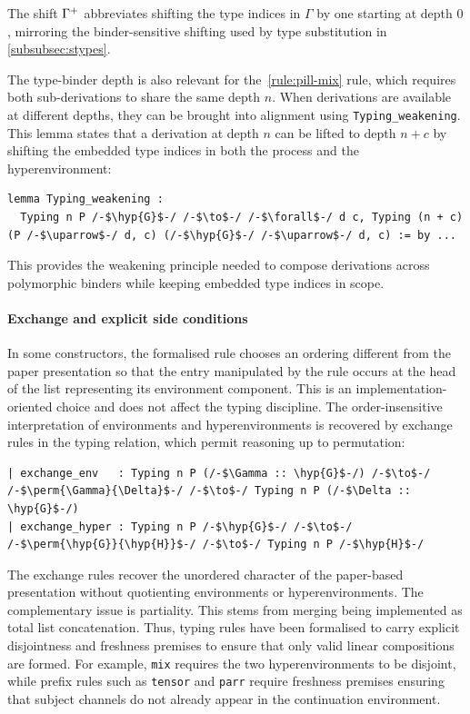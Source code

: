 The shift {$\Gamma^{+}$} abbreviates shifting the type indices in $\Gamma$ by one starting at depth $0$, mirroring the binder-sensitive shifting used by type substitution in \cref{subsubsec:stypes}.

The type-binder depth is also relevant for the~\ref{rule:pill-mix} rule, which requires both sub-derivations to share the same depth $n$. When derivations are available at different depths, they can be brought into alignment using \texttt{Typing\_weakening}. This lemma states that a derivation at depth $n$ can be lifted to depth $n+c$ by shifting the embedded type indices in both the process and the hyperenvironment:

\begin{lstlisting}[language=Lean4]
lemma Typing_weakening :
  Typing n P /-$\hyp{G}$-/ /-$\to$-/ /-$\forall$-/ d c, Typing (n + c) (P /-$\uparrow$-/ d, c) (/-$\hyp{G}$-/ /-$\uparrow$-/ d, c) := by ...
\end{lstlisting}

This provides the weakening principle needed to compose derivations across polymorphic binders while keeping embedded type indices in scope.

\paragraph{Exchange and explicit side conditions}
In some constructors, the formalised rule chooses an ordering different from the paper presentation so that the entry manipulated by the rule occurs at the head of the list representing its environment component. This is an implementation-oriented choice and does not affect the typing discipline. The order-insensitive interpretation of environments and hyperenvironments is recovered by exchange rules in the typing relation, which permit reasoning up to permutation:

\begin{lstlisting}[language=Lean4]
| exchange_env   : Typing n P (/-$\Gamma :: \hyp{G}$-/) /-$\to$-/ /-$\perm{\Gamma}{\Delta}$-/ /-$\to$-/ Typing n P (/-$\Delta :: \hyp{G}$-/)
| exchange_hyper : Typing n P /-$\hyp{G}$-/ /-$\to$-/ /-$\perm{\hyp{G}}{\hyp{H}}$-/ /-$\to$-/ Typing n P /-$\hyp{H}$-/
\end{lstlisting}

The exchange rules recover the unordered character of the paper-based presentation without quotienting environments or hyperenvironments. The complementary issue is partiality. This stems from merging being implemented as total list concatenation. Thus, typing rules have been formalised to carry explicit disjointness and freshness premises to ensure that only valid linear compositions are formed. For example, \texttt{mix} requires the two hyperenvironments to be disjoint, while prefix rules such as \texttt{tensor} and \texttt{parr} require freshness premises ensuring that subject channels do not already appear in the continuation environment.


